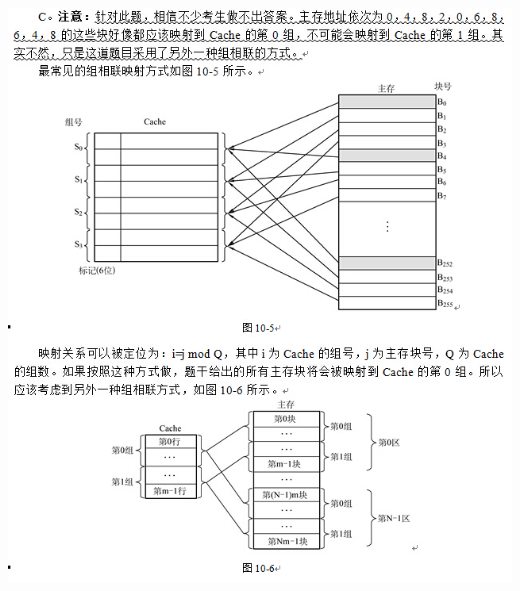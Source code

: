 \begin{solution}\includegraphics[width=6.61458in,height=7.55208in]{computerassets/ff0c95e262008e1450dfd6e70ac0cf03.jpeg}

\end{solution}
